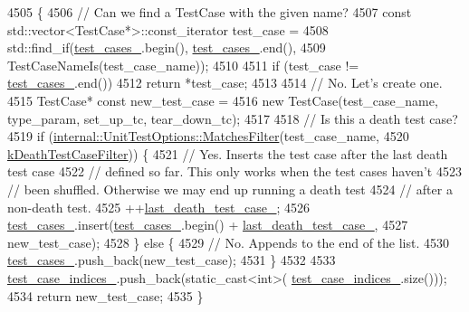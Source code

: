 \begin{DoxyCode}
4505                                                                            \{
4506   \textcolor{comment}{// Can we find a TestCase with the given name?}
4507   \textcolor{keyword}{const} std::vector<TestCase*>::const\_iterator test\_case =
4508       std::find\_if(\hyperlink{classtesting_1_1internal_1_1UnitTestImpl_a79ec0f733ada2898efd1a7fbd8587fb3}{test\_cases\_}.begin(), \hyperlink{classtesting_1_1internal_1_1UnitTestImpl_a79ec0f733ada2898efd1a7fbd8587fb3}{test\_cases\_}.end(),
4509                    TestCaseNameIs(test\_case\_name));
4510 
4511   \textcolor{keywordflow}{if} (test\_case != \hyperlink{classtesting_1_1internal_1_1UnitTestImpl_a79ec0f733ada2898efd1a7fbd8587fb3}{test\_cases\_}.end())
4512     \textcolor{keywordflow}{return} *test\_case;
4513 
4514   \textcolor{comment}{// No.  Let's create one.}
4515   TestCase* \textcolor{keyword}{const} new\_test\_case =
4516       \textcolor{keyword}{new} TestCase(test\_case\_name, type\_param, set\_up\_tc, tear\_down\_tc);
4517 
4518   \textcolor{comment}{// Is this a death test case?}
4519   \textcolor{keywordflow}{if} (\hyperlink{classtesting_1_1internal_1_1UnitTestOptions_a67fc0adaffbb8d320b92e42e05017e4e}{internal::UnitTestOptions::MatchesFilter}(test\_case\_name,
4520                                                \hyperlink{namespacetesting_a23c33f4bfcc3c2e5e620eff31a98892d}{kDeathTestCaseFilter})) \{
4521     \textcolor{comment}{// Yes.  Inserts the test case after the last death test case}
4522     \textcolor{comment}{// defined so far.  This only works when the test cases haven't}
4523     \textcolor{comment}{// been shuffled.  Otherwise we may end up running a death test}
4524     \textcolor{comment}{// after a non-death test.}
4525     ++\hyperlink{classtesting_1_1internal_1_1UnitTestImpl_afd663a104bb0a6df2c5143454f78e305}{last\_death\_test\_case\_};
4526     \hyperlink{classtesting_1_1internal_1_1UnitTestImpl_a79ec0f733ada2898efd1a7fbd8587fb3}{test\_cases\_}.insert(\hyperlink{classtesting_1_1internal_1_1UnitTestImpl_a79ec0f733ada2898efd1a7fbd8587fb3}{test\_cases\_}.begin() + 
      \hyperlink{classtesting_1_1internal_1_1UnitTestImpl_afd663a104bb0a6df2c5143454f78e305}{last\_death\_test\_case\_},
4527                        new\_test\_case);
4528   \} \textcolor{keywordflow}{else} \{
4529     \textcolor{comment}{// No.  Appends to the end of the list.}
4530     \hyperlink{classtesting_1_1internal_1_1UnitTestImpl_a79ec0f733ada2898efd1a7fbd8587fb3}{test\_cases\_}.push\_back(new\_test\_case);
4531   \}
4532 
4533   \hyperlink{classtesting_1_1internal_1_1UnitTestImpl_a9b30891f1a9d5b5c25de2bef0f0bb49a}{test\_case\_indices\_}.push\_back(static\_cast<int>(
      \hyperlink{classtesting_1_1internal_1_1UnitTestImpl_a9b30891f1a9d5b5c25de2bef0f0bb49a}{test\_case\_indices\_}.size()));
4534   \textcolor{keywordflow}{return} new\_test\_case;
4535 \}
\end{DoxyCode}
